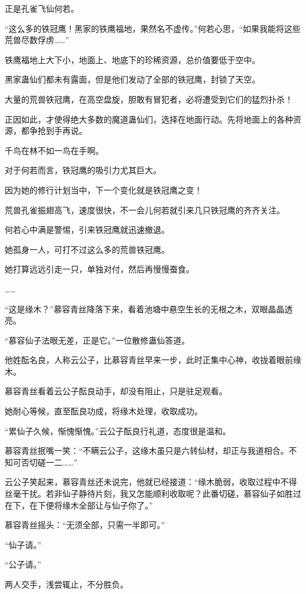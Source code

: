 \begin{this_body}
正是孔雀飞仙何若。

“这么多的铁冠鹰！黑家的铁鹰福地，果然名不虚传。”何若心思，“如果我能将这些荒兽尽数俘虏……”

铁鹰福地上大下小，地面上、地底下的珍稀资源，总价值要低于空中。

黑家蛊仙们都未有露面，但是他们发动了全部的铁冠鹰，封锁了天空。

大量的荒兽铁冠鹰，在高空盘旋，胆敢有冒犯者，必将遭受到它们的猛烈扑杀！

正因如此，才使得绝大多数的魔道蛊仙们，选择在地面行动。先将地面上的各种资源，都争抢到手再说。

千鸟在林不如一鸟在手啊。

对于何若而言，铁冠鹰的吸引力尤其巨大。

因为她的修行计划当中，下一个变化就是铁冠鹰之变！

荒兽孔雀振翅高飞，速度很快，不一会儿何若就引来几只铁冠鹰的齐齐关注。

何若心中满是警惕，引来铁冠鹰就迅速撤退。

她孤身一人，可打不过这么多的荒兽铁冠鹰。

她打算远远引走一只，单独对付，然后再慢慢蚕食。

……

“这是缘木？”慕容青丝降落下来，看着池塘中悬空生长的无根之木，双眼晶晶透亮。

“慕容仙子法眼无差，正是它。”一位散修蛊仙答道。

他姓酝名良，人称云公子，比慕容青丝早来一步，此时正集中心神，收拢着眼前缘木。

慕容青丝看着云公子酝良动手，却没有阻止，只是驻足观看。

她耐心等候，直至酝良功成，将缘木处理，收取成功。

“累仙子久候，惭愧惭愧。”云公子酝良行礼道，态度很是温和。

慕容青丝抿嘴一笑：“不瞒云公子，这缘木虽只是六转仙材，却正与我道相合。不知可否切磋一二……”

云公子笑起来，慕容青丝还未说完，他就已经接道：“缘木脆弱，收取过程中不得丝毫干扰。若非仙子静待片刻，我又怎能顺利收取呢？此番切磋，慕容仙子如胜过在下，在下便将缘木全部让与仙子你了。”

慕容青丝摇头：“无须全部，只需一半即可。”

“仙子请。”

“公子请。”

两人交手，浅尝辄止，不分胜负。


\end{this_body}
